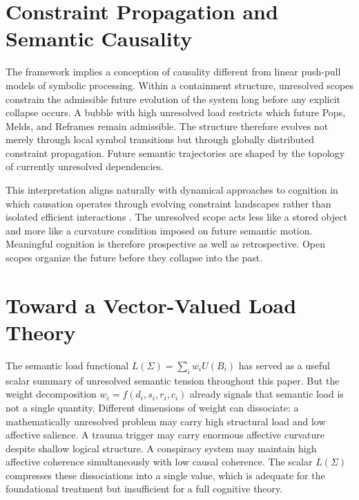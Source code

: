 \documentclass[12pt, a4paper]{article}
\theoremstyle{plain}
\theoremstyle{definition}
\theoremstyle{remark}
\begin{document}
\section{Constraint Propagation and Semantic Causality}

The framework implies a conception of causality different from linear
push-pull models of symbolic processing. Within a containment structure,
unresolved scopes constrain the admissible future evolution of the system long
before any explicit collapse occurs. A bubble with high unresolved load
restricts which future Pops, Melds, and Reframes remain admissible. The
structure therefore evolves not merely through local symbol transitions but
through globally distributed constraint propagation. Future semantic
trajectories are shaped by the topology of currently unresolved dependencies.

This interpretation aligns naturally with dynamical approaches to cognition
in which causation operates through evolving constraint landscapes rather than
isolated efficient interactions \cite{Juarrero1999}. The unresolved scope acts
less like a stored object and more like a curvature condition imposed on future
semantic motion. Meaningful cognition is therefore prospective as well as
retrospective. Open scopes organize the future before they collapse into the
past.

\section{Toward a Vector-Valued Load Theory}

The semantic load functional $L(\Sigma) = \sum_i w_i U(B_i)$ has served as a
useful scalar summary of unresolved semantic tension throughout this paper.
But the weight decomposition $w_i = f(d_i, s_i, r_i, c_i)$ already signals
that semantic load is not a single quantity. Different dimensions of weight
can dissociate: a mathematically unresolved problem may carry high structural
load and low affective salience. A trauma trigger may carry enormous affective
curvature despite shallow logical structure. A conspiracy system may maintain
high affective coherence simultaneously with low causal coherence. The scalar
$L(\Sigma)$ compresses these dissociations into a single value, which is
adequate for the foundational treatment but insufficient for a full cognitive
theory.
\end{document}

